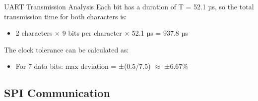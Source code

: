 \begin{example2}{UART Transmission Analysis}
Each bit has a duration of T = 52.1 µs, so the total transmission time for both characters is:
\begin{itemize}
    \item 2 characters × 9 bits per character × 52.1 µs = 937.8 µs
\end{itemize}

The clock tolerance can be calculated as:
\begin{itemize}
    \item For 7 data bits: max deviation = ±(0.5/7.5) $\approx$ ±6.67\%
\end{itemize}
\end{example2}

\subsection{SPI Communication}


